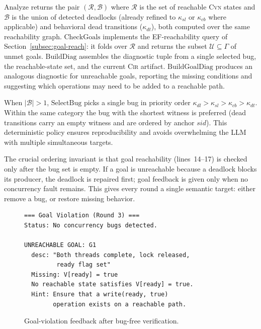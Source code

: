 $\text{Analyze}$ returns the pair $(\mathcal{R},\mathcal{B})$ where
$\mathcal{R}$ is the set of reachable \textsc{Cvn} states and
$\mathcal{B}$ is the union of detected deadlocks (already refined to
$\kappa_{sl}$ or $\kappa_{cb}$ where applicable) and behavioral dead
transitions ($\kappa_{dt}$), both computed over the same reachability
graph. $\text{CheckGoals}$
implements the EF-reachability query of
Section~\ref{subsec:goal-reach}: it folds over $\mathcal{R}$ and
returns the subset $\mathcal{U}\subseteq\Gamma$ of unmet goals.
$\text{BuildDiag}$ assembles the diagnostic tuple from a single
selected bug, the reachable-state set, and the current \textsc{Cir}
artifact. $\text{BuildGoalDiag}$ produces an analogous diagnostic for
unreachable goals, reporting the missing conditions and suggesting
which operations may need to be added to a reachable path.

When $|\mathcal{B}|>1$, $\text{SelectBug}$ picks a single bug in
priority order
$\kappa_{dl}>\kappa_{sl}>\kappa_{cb}>\kappa_{dt}$. Within the same
category the bug with the shortest witness is preferred (dead
transitions carry an empty witness and are ordered by anchor
$\mathit{sid}$). This deterministic policy
ensures reproducibility and avoids overwhelming the LLM with multiple
simultaneous targets.

The crucial ordering invariant is that goal reachability
(lines~14--17) is checked only after the bug set is empty.
If a goal is unreachable because a deadlock blocks its producer, the
deadlock is repaired first; goal feedback is given only when no
concurrency fault remains. This gives every round a single semantic
target: either remove a bug, or restore missing behavior.

\begin{figure}[t]
\begin{lstlisting}[basicstyle=\small\ttfamily,frame=single]
=== Goal Violation (Round 3) ===
Status: No concurrency bugs detected.

UNREACHABLE GOAL: G1
  desc: "Both threads complete, lock released,
         ready flag set"
  Missing: V[ready] = true
  No reachable state satisfies V[ready] = true.
  Hint: Ensure that a write(ready, true)
        operation exists on a reachable path.
\end{lstlisting}
\caption{Goal-violation feedback after bug-free verification.}
\label{fig:goal-violation}
\end{figure}

